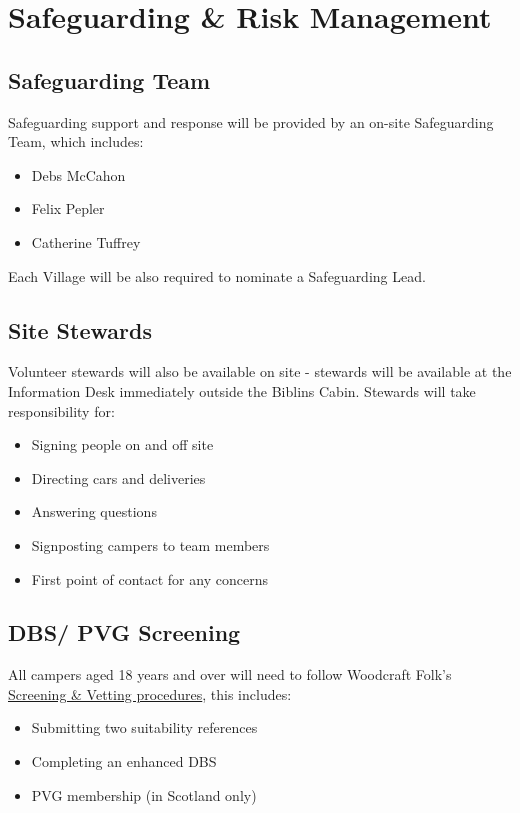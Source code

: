 \documentclass[a4paper, 11pt]{report}
\begin{document}
\chapter{Safeguarding \& Risk Management}
\section{Safeguarding Team}
Safeguarding support and response will be provided by an on-site Safeguarding Team, which includes:
\begin{itemize}
    \item Debs McCahon
    \item Felix Pepler
    \item Catherine Tuffrey
\end{itemize}
Each Village will be also required to nominate a Safeguarding Lead.

\section{Site Stewards}
Volunteer stewards will also be available on site - stewards will be available at the Information Desk immediately outside the Biblins Cabin. Stewards will take responsibility for:
\begin{itemize}
    \item Signing people on and off site
    \item Directing cars and deliveries
    \item Answering questions
    \item Signposting campers to team members
    \item First point of contact for any concerns
\end{itemize}

\section{DBS/ PVG Screening}
All campers aged 18 years and over will need to follow Woodcraft Folk's \href{https://woodcraft.org.uk/resources/volunteer-screening/}{Screening \& Vetting procedures}, this includes: 
\begin{itemize}
    \item Submitting two suitability references
    \item Completing an enhanced DBS 
    \item PVG membership (in Scotland only) 
\end{itemize}
\end{document}
